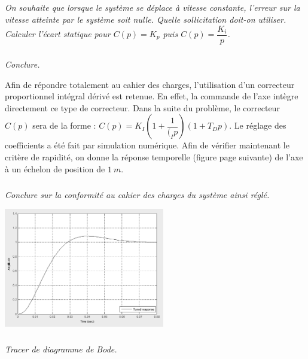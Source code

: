 \documentclass[10pt,fleqn]{article} %
\begin{document}
\begin{multicols}{2}
\subparagraph{}
\textit{On souhaite que lorsque le système se déplace à vitesse constante, l'erreur sur la vitesse atteinte par le système soit nulle. Quelle sollicitation doit-on utiliser. Calculer l'écart statique pour $C(p)=K_p$ puis $C(p)=\dfrac{K_i}{p}$.}
\ifprof
\begin{corrige}
\end{corrige}
\else
\fi

\subparagraph{}
\textit{Conclure.}
\ifprof
\begin{corrige}
\end{corrige}
\else
\fi

\ifprof
\else

Afin de répondre totalement au cahier des charges, l'utilisation d'un correcteur proportionnel intégral dérivé est retenue. En effet, la commande de l'axe intègre directement ce type de correcteur. Dans la suite du problème, le correcteur $C(p)$ sera de la forme : $C(p)=K_I \left(1+\dfrac{1}{(_I p}\right)\left(1+T_D p\right)$. Le réglage des coefficients a été fait par simulation numérique.
Afin de vérifier maintenant le critère de rapidité, on donne la réponse temporelle (figure page suivante) de l'axe à un échelon de position de $\SI{1}{m}$.

\fi

\subparagraph{}
\textit{Conclure sur la conformité au cahier des charges du système ainsi réglé.}
\ifprof
\begin{corrige}
\end{corrige}
\else
\fi

\ifprof
\else
 
 \begin{center}
\includegraphics[width=7cm]{images/image11}
\end{center} 

\fi
 

\subparagraph{}
\textit{Tracer de diagramme de Bode.}
\ifprof
\begin{corrige}
\end{corrige}
\else
\fi


\end{multicols}
\end{document}
